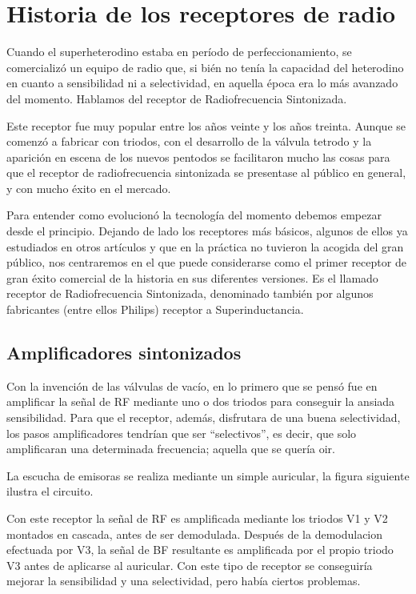 \documentclass[a4paper,10pt,spanish]{report}
\let\sphinxpxdimen\pdfpxdimen\else\newdimen\sphinxpxdimen
\begin{document}
\section{Historia de los receptores de radio}
\label{\detokenize{introduccion/sistemas:Historia-de-los-receptores-de-radio}}
Cuando el superheterodino estaba en período de perfeccionamiento, se comercializó un equipo de radio que, si bién no tenía la capacidad del heterodino en cuanto a sensibilidad ni a selectividad, en aquella época era lo más avanzado del momento. Hablamos del receptor de Radiofrecuencia Sintonizada.

Este receptor fue muy popular entre los años veinte y los años treinta. Aunque se comenzó a fabricar con triodos, con el desarrollo de la válvula tetrodo y la aparición en escena de los nuevos pentodos se facilitaron mucho las cosas para que el receptor de radiofrecuencia sintonizada se presentase al público en general, y con mucho éxito en el mercado.

Para entender como evolucionó la tecnología del momento debemos empezar desde el principio. Dejando de lado los receptores más básicos, algunos de ellos ya estudiados en otros artículos y que en la práctica no tuvieron la acogida del gran público, nos centraremos en el que puede considerarse como el primer receptor de gran éxito comercial de la historia en sus diferentes versiones. Es el llamado receptor de Radiofrecuencia Sintonizada, denominado también por algunos fabricantes (entre ellos
Philips) receptor a Superinductancia.


\subsection{Amplificadores sintonizados}
\label{\detokenize{introduccion/sistemas:Amplificadores-sintonizados}}
Con la invención de las válvulas de vacío, en lo primero que se pensó fue en amplificar la señal de RF mediante uno o dos triodos para conseguir la ansiada sensibilidad. Para que el receptor, además, disfrutara de una buena selectividad, los pasos amplificadores tendrían que ser “selectivos”, es decir, que solo amplificaran una determinada frecuencia; aquella que se quería oir.

La escucha de emisoras se realiza mediante un simple auricular, la figura siguiente ilustra el circuito.

\sphinxincludegraphics[width=588\sphinxpxdimen,height=210\sphinxpxdimen]{{receprfs1low}.png}

Con este receptor la señal de RF es amplificada mediante los triodos V1 y V2 montados en cascada, antes de ser demodulada. Después de la demodulacion efectuada por V3, la señal de BF resultante es amplificada por el propio triodo V3 antes de aplicarse al auricular. Con este tipo de receptor se conseguiría mejorar la sensibilidad y una selectividad, pero había ciertos problemas.
\end{document}
